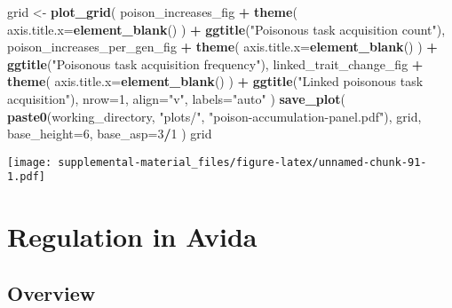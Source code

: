 \documentclass[]{book}
\newenvironment{Shaded}{\begin{snugshade}}{\end{snugshade}}
\newcommand{\DataTypeTok}[1]{\textcolor[rgb]{0.13,0.29,0.53}{#1}}
\newcommand{\DecValTok}[1]{\textcolor[rgb]{0.00,0.00,0.81}{#1}}
\newcommand{\KeywordTok}[1]{\textcolor[rgb]{0.13,0.29,0.53}{\textbf{#1}}}
\newcommand{\NormalTok}[1]{#1}
\newcommand{\OperatorTok}[1]{\textcolor[rgb]{0.81,0.36,0.00}{\textbf{#1}}}
\newcommand{\StringTok}[1]{\textcolor[rgb]{0.31,0.60,0.02}{#1}}
\begin{document}
\begin{Shaded}
\begin{Highlighting}[]
\NormalTok{grid <-}\StringTok{ }\KeywordTok{plot_grid}\NormalTok{(}
\NormalTok{  poison_increases_fig }\OperatorTok{+}
\StringTok{    }\KeywordTok{theme}\NormalTok{(}
      \DataTypeTok{axis.title.x=}\KeywordTok{element_blank}\NormalTok{()}
\NormalTok{    ) }\OperatorTok{+}
\StringTok{    }\KeywordTok{ggtitle}\NormalTok{(}\StringTok{"Poisonous task acquisition count"}\NormalTok{),}
\NormalTok{  poison_increases_per_gen_fig }\OperatorTok{+}
\StringTok{    }\KeywordTok{theme}\NormalTok{(}
      \DataTypeTok{axis.title.x=}\KeywordTok{element_blank}\NormalTok{()}
\NormalTok{    ) }\OperatorTok{+}
\StringTok{    }\KeywordTok{ggtitle}\NormalTok{(}\StringTok{"Poisonous task acquisition frequency"}\NormalTok{),}
\NormalTok{  linked_trait_change_fig }\OperatorTok{+}
\StringTok{    }\KeywordTok{theme}\NormalTok{(}
      \DataTypeTok{axis.title.x=}\KeywordTok{element_blank}\NormalTok{()}
\NormalTok{    ) }\OperatorTok{+}
\StringTok{    }\KeywordTok{ggtitle}\NormalTok{(}\StringTok{"Linked poisonous task acquisition"}\NormalTok{),}
  \DataTypeTok{nrow=}\DecValTok{1}\NormalTok{,}
  \DataTypeTok{align=}\StringTok{"v"}\NormalTok{,}
  \DataTypeTok{labels=}\StringTok{"auto"}
\NormalTok{)}
\KeywordTok{save_plot}\NormalTok{(}
   \KeywordTok{paste0}\NormalTok{(working_directory, }\StringTok{"plots/"}\NormalTok{, }\StringTok{"poison-accumulation-panel.pdf"}\NormalTok{),}
\NormalTok{   grid,}
   \DataTypeTok{base_height=}\DecValTok{6}\NormalTok{,}
   \DataTypeTok{base_asp=}\DecValTok{3}\OperatorTok{/}\DecValTok{1}
\NormalTok{)}
\NormalTok{grid}
\end{Highlighting}
\end{Shaded}

\texttt{[image: supplemental-material\_files/figure-latex/unnamed-chunk-91-1.pdf]}

\hypertarget{regulation-in-avida}{%
\chapter{Regulation in Avida}\label{regulation-in-avida}}

\hypertarget{overview-4}{%
\section{Overview}\label{overview-4}}
\end{document}
